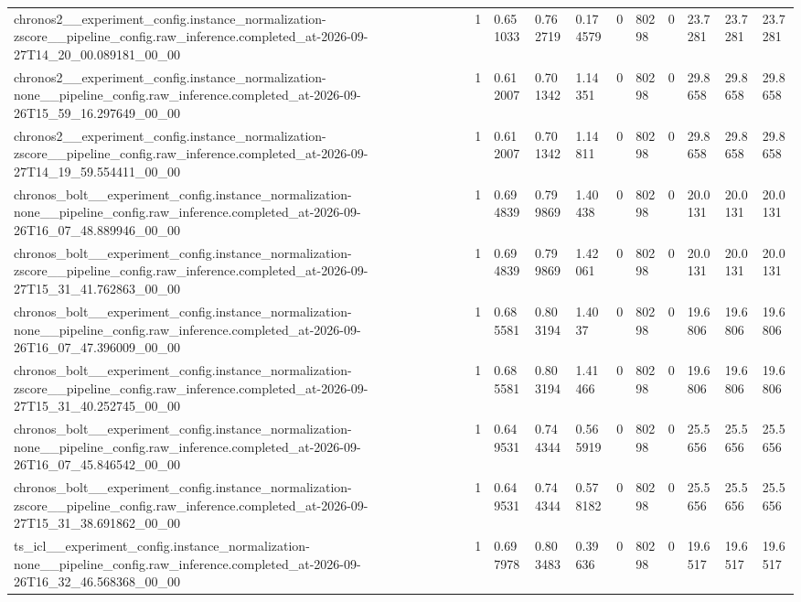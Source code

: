 \begin{tabular}{lllllllllll}
chronos2\_\_experiment\_config.instance\_normalization-zscore\_\_pipeline\_config.raw\_inference.completed\_at-2026-09-27T14\_20\_00.089181\_00\_00 & 1 & 0.651033 & 0.762719 & 0.174579 & 0 & 80298 & 0 & 23.7281 & 23.7281 & 23.7281 \\
chronos2\_\_experiment\_config.instance\_normalization-none\_\_pipeline\_config.raw\_inference.completed\_at-2026-09-26T15\_59\_16.297649\_00\_00 & 1 & 0.612007 & 0.701342 & 1.14351 & 0 & 80298 & 0 & 29.8658 & 29.8658 & 29.8658 \\
chronos2\_\_experiment\_config.instance\_normalization-zscore\_\_pipeline\_config.raw\_inference.completed\_at-2026-09-27T14\_19\_59.554411\_00\_00 & 1 & 0.612007 & 0.701342 & 1.14811 & 0 & 80298 & 0 & 29.8658 & 29.8658 & 29.8658 \\
chronos\_bolt\_\_experiment\_config.instance\_normalization-none\_\_pipeline\_config.raw\_inference.completed\_at-2026-09-26T16\_07\_48.889946\_00\_00 & 1 & 0.694839 & 0.799869 & 1.40438 & 0 & 80298 & 0 & 20.0131 & 20.0131 & 20.0131 \\
chronos\_bolt\_\_experiment\_config.instance\_normalization-zscore\_\_pipeline\_config.raw\_inference.completed\_at-2026-09-27T15\_31\_41.762863\_00\_00 & 1 & 0.694839 & 0.799869 & 1.42061 & 0 & 80298 & 0 & 20.0131 & 20.0131 & 20.0131 \\
chronos\_bolt\_\_experiment\_config.instance\_normalization-none\_\_pipeline\_config.raw\_inference.completed\_at-2026-09-26T16\_07\_47.396009\_00\_00 & 1 & 0.685581 & 0.803194 & 1.4037 & 0 & 80298 & 0 & 19.6806 & 19.6806 & 19.6806 \\
chronos\_bolt\_\_experiment\_config.instance\_normalization-zscore\_\_pipeline\_config.raw\_inference.completed\_at-2026-09-27T15\_31\_40.252745\_00\_00 & 1 & 0.685581 & 0.803194 & 1.41466 & 0 & 80298 & 0 & 19.6806 & 19.6806 & 19.6806 \\
chronos\_bolt\_\_experiment\_config.instance\_normalization-none\_\_pipeline\_config.raw\_inference.completed\_at-2026-09-26T16\_07\_45.846542\_00\_00 & 1 & 0.649531 & 0.744344 & 0.565919 & 0 & 80298 & 0 & 25.5656 & 25.5656 & 25.5656 \\
chronos\_bolt\_\_experiment\_config.instance\_normalization-zscore\_\_pipeline\_config.raw\_inference.completed\_at-2026-09-27T15\_31\_38.691862\_00\_00 & 1 & 0.649531 & 0.744344 & 0.578182 & 0 & 80298 & 0 & 25.5656 & 25.5656 & 25.5656 \\
ts\_icl\_\_experiment\_config.instance\_normalization-none\_\_pipeline\_config.raw\_inference.completed\_at-2026-09-26T16\_32\_46.568368\_00\_00 & 1 & 0.697978 & 0.803483 & 0.39636 & 0 & 80298 & 0 & 19.6517 & 19.6517 & 19.6517 \\

\end{tabular}
